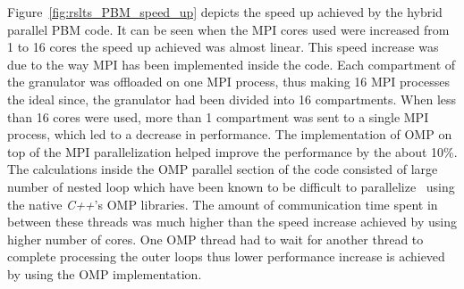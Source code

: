 \documentclass[preprint,11pt,authoryear]{elsarticle}
\begin{document}
Figure~\ref{fig:rslts_PBM_speed_up} depicts the speed up achieved by the hybrid parallel PBM code. It 
can be seen when the MPI cores used were increased from 1 to 16 cores the speed up achieved was 
almost linear. This speed increase was due to the way MPI has been implemented inside the code. 
Each compartment of the granulator was  offloaded on one MPI process, thus making 16 MPI processes 
the ideal since, the granulator had been divided into 16 compartments. When less than 16 cores were used, 
more than 1 compartment was sent to a single MPI process, which led to a 
decrease in performance. The implementation of OMP on top of the MPI parallelization helped improve 
the performance by the about 10\%. The calculations inside the OMP parallel section of the code 
consisted of large number of nested loop which have been known to be difficult to parallelize~\citep{He2016} 
using the native \textit{C++}'s OMP libraries. The amount of communication time spent in 
between these threads was much higher than the speed increase achieved by using higher number of 
cores. One OMP thread had to wait for another thread to complete processing the outer loops thus lower 
performance increase is achieved by using the OMP implementation. 
\end{document}
